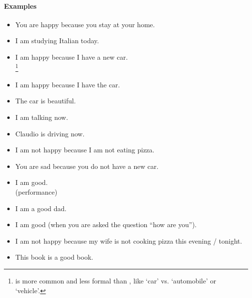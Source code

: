 \paragraph{Examples}
\begin{itemize}
    \item  You are happy because you stay at your home. \\
    \item  I am studying Italian today. \\
    \item  I am happy because I have a new car. \\
    \footnote{ is more common and less formal than , like `car' vs. `automobile' or `vehicle'.}
    \item  I am happy because I have the car. \\
    \item  The car is beautiful. \\
    \item  I am talking now. \\
    \item  Claudio is driving now. \\
    \item  I am not happy because I am not eating pizza. \\
    \item  You are sad because you do not have a new car. \\
    \item  I am good. \\
     (performance)
    \item  I am a good dad. \\
    \item  I am good (when you are asked the question ``how are you''). \\
    \item  I am not happy because my wife is not cooking pizza this evening / tonight. \\
    \item  This book is a good book. \\
\end{itemize}
